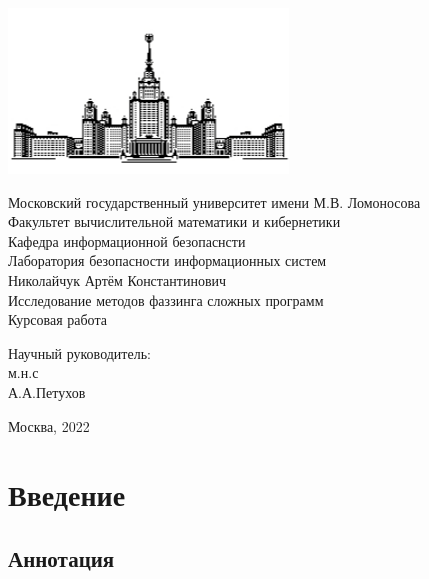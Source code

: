 \documentclass[a4paper]{article}
\begin{document}
 
\begin{center}
\includegraphics{MSU}

\hfill \break
\normalsize{Московский государственный университет имени М.В. Ломоносова}\\
\normalsize{Факультет вычислительной математики и кибернетики}\\
\normalsize{Кафедра информационной безопаснсти}\\
\normalsize{Лаборатория безопасности информационных систем}\\
 \hfill \break
\normalsize{Николайчук Артём Константинович}\\
\hfill\break
\hfill \break
\hfill \break
\hfill \break
\large{Исследование методов фаззинга сложных программ}\\
\hfill \break
\hfill \break
\hfill \break
\normalsize{Курсовая работа}\\
\hfill \break
\hfill \break
\hfill \break
\hfill \break
\hfill \break
\hfill \break
\hfill \break
\hfill \break
\begin{flushright}
    \normalsize{Научный руководитель:}\\
    \normalsize{м.н.с}\\
    \normalsize{А.А.Петухов}\\
\end{flushright}
\end{center}
\vspace*{\fill}
\begin{center} Москва, 2022 \end{center}
\thispagestyle{empty}
 
\newpage
     
    \tableofcontents
\newpage
 
\newpage
\section{Введение}

\subsection{Аннотация}
\indent
\end{document}
